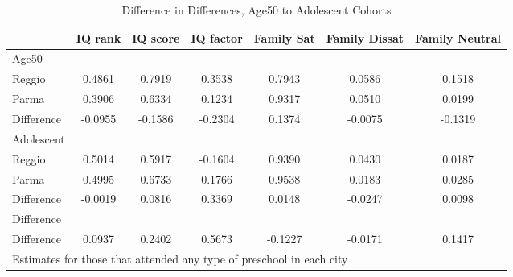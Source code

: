 \begin{table}[htbp]\centering
\caption{Difference in Differences, Age50 to Adolescent Cohorts}
\begin{tabular}{l*{6}{c}}
\hline\hline
            &     IQ rank&    IQ score&   IQ factor&  Family Sat&Family Dissat&Family Neutral\\
\hline
Age50       &            &            &            &            &            &            \\
Reggio      &      0.4861&      0.7919&      0.3538&      0.7943&      0.0586&      0.1518\\
Parma       &      0.3906&      0.6334&      0.1234&      0.9317&      0.0510&      0.0199\\
Difference  &     -0.0955&     -0.1586&     -0.2304&      0.1374&     -0.0075&     -0.1319\\
\hline
Adolescent  &            &            &            &            &            &            \\
Reggio      &      0.5014&      0.5917&     -0.1604&      0.9390&      0.0430&      0.0187\\
Parma       &      0.4995&      0.6733&      0.1766&      0.9538&      0.0183&      0.0285\\
Difference  &     -0.0019&      0.0816&      0.3369&      0.0148&     -0.0247&      0.0098\\
\hline
Difference  &            &            &            &            &            &            \\
Difference  &      0.0937&      0.2402&      0.5673&     -0.1227&     -0.0171&      0.1417\\
\hline\hline
\multicolumn{7}{l}{\footnotesize Estimates for those that attended any type of preschool in each city}\\
\end{tabular}
\end{table}
